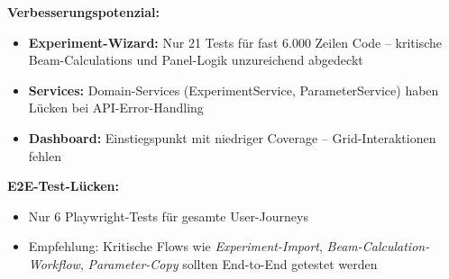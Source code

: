 \textbf{Verbesserungspotenzial:}
\begin{itemize}[noitemsep]
	\item \textbf{Experiment-Wizard:} Nur 21 Tests für fast 6.000 Zeilen Code -- kritische Beam-Calculations und Panel-Logik unzureichend abgedeckt
	\item \textbf{Services:} Domain-Services (ExperimentService, ParameterService) haben Lücken bei API-Error-Handling
	\item \textbf{Dashboard:} Einstiegspunkt mit niedriger Coverage -- Grid-Interaktionen fehlen
\end{itemize}

\textbf{E2E-Test-Lücken:}
\begin{itemize}[noitemsep]
	\item Nur 6 Playwright-Tests für gesamte User-Journeys
	\item Empfehlung: Kritische Flows wie \textit{Experiment-Import}, \textit{Beam-Calculation-Workflow}, \textit{Parameter-Copy} sollten End-to-End getestet werden
\end{itemize}
